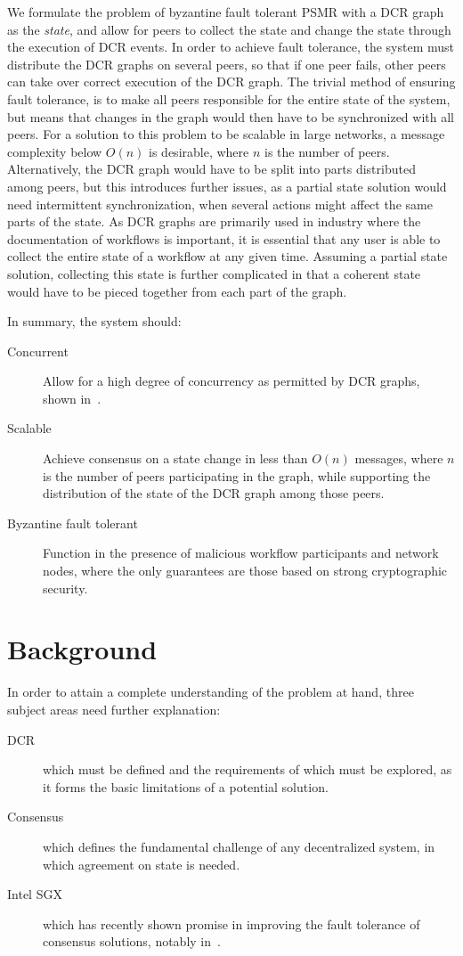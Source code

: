 \documentclass{article}
\begin{document}
	We formulate the problem of byzantine fault tolerant PSMR with a DCR graph as the \textit{state}, and allow for peers to collect the state and change the state through the execution of DCR events.
	In order to achieve fault tolerance, the system must distribute the DCR graphs on several peers, so that if one peer fails, other peers can take over correct execution of the DCR graph.
	The trivial method of ensuring fault tolerance, is to make all peers responsible for the entire state of the system, but means that changes in the graph would then have to be synchronized with all peers.
	For a solution to this problem to be scalable in large networks, a message complexity below $O(n)$ is desirable, where $n$ is the number of peers.
	Alternatively, the DCR graph would have to be split into parts distributed among peers, but this introduces further issues, as a partial state solution would need intermittent synchronization, when several actions might affect the same parts of the state.
	As DCR graphs are primarily used in industry where the documentation of workflows is important, it is essential that any user is able to collect the entire state of a workflow at any given time.
	Assuming a partial state solution, collecting this state is further complicated in that a coherent state would have to be pieced together from each part of the graph.

	In summary, the system should:
	\begin{description}
		\item[Concurrent] Allow for a high degree of concurrency as permitted by DCR graphs, shown in~\cite{debois_concurrency_2015}.
		\item[Scalable] Achieve consensus on a state change in less than $O(n)$ messages, where $n$ is the number of peers participating in the graph, while supporting the distribution of the state of the DCR graph among those peers.
		\item[Byzantine fault tolerant] Function in the presence of malicious workflow participants and network nodes, where the only guarantees are those based on strong cryptographic security.
	\end{description}

\section{Background}

In order to attain a complete understanding of the problem at hand, three subject areas need further explanation:
\begin{description}
	\item[DCR] which must be defined and the requirements of which must be explored, as it forms the basic limitations of a potential solution.
	\item[Consensus] which defines the fundamental challenge of any decentralized system, in which agreement on state is needed.
	\item[Intel SGX] which has recently shown promise in improving the fault tolerance of consensus solutions, notably in~\cite{kapitza_cheapbft_2012,veronese_efficient_2013,liu_scalable_2016}.
\end{description}
\end{document}
